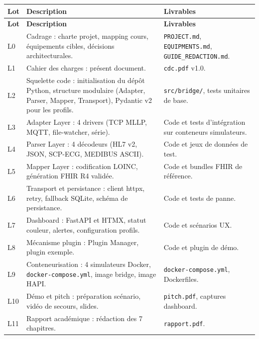 \bridgezebra
\begin{longtable}{p{1.5cm}p{6cm}p{7cm}}
  \toprule
  \rowcolor{bridgeblue!90}
  {\color{white}\bfseries Lot} & {\color{white}\bfseries Description} & {\color{white}\bfseries Livrables} \\
  \midrule
  \endfirsthead
  \toprule
  \rowcolor{bridgeblue!90}
  {\color{white}\bfseries Lot} & {\color{white}\bfseries Description} & {\color{white}\bfseries Livrables} \\
  \midrule
  \endhead
  \bottomrule
  \endfoot
  L0  & Cadrage : charte projet, mapping cours, équipements cibles, décisions architecturales. & \texttt{PROJECT.md}, \texttt{EQUIPMENTS.md}, \texttt{GUIDE\_REDACTION.md}. \\
  L1  & Cahier des charges : présent document.                                                  & \texttt{cdc.pdf} v1.0. \\
  L2  & Squelette code : initialisation du dépôt Python, structure modulaire (Adapter, Parser, Mapper, Transport), Pydantic v2 pour les profils. & \texttt{src/bridge/}, tests unitaires de base. \\
  L3  & Adapter Layer : 4 drivers (TCP MLLP, MQTT, file-watcher, série).                        & Code et tests d'intégration sur conteneurs simulateurs. \\
  L4  & Parser Layer : 4 décodeurs (HL7 v2, JSON, SCP-ECG, MEDIBUS ASCII).                      & Code et jeux de données de test. \\
  L5  & Mapper Layer : codification LOINC, génération FHIR R4 validée.                          & Code et bundles FHIR de référence. \\
  L6  & Transport et persistance : client httpx, retry, fallback SQLite, schéma de persistance. & Code et tests de panne. \\
  L7  & Dashboard : FastAPI et HTMX, statut couleur, alertes, configuration profils.            & Code et scénarios UX. \\
  L8  & Mécanisme plugin : Plugin Manager, plugin exemple.                                      & Code et plugin de démo. \\
  L9  & Conteneurisation : 4 simulateurs Docker, \texttt{docker-compose.yml}, image bridge, image HAPI. & \texttt{docker-compose.yml}, Dockerfiles. \\
  L10 & Démo et pitch : préparation scénario, vidéo de secours, slides.                         & \texttt{pitch.pdf}, captures dashboard. \\
  L11 & Rapport académique : rédaction des 7 chapitres.                                         & \texttt{rapport.pdf}. \\
\end{longtable}

